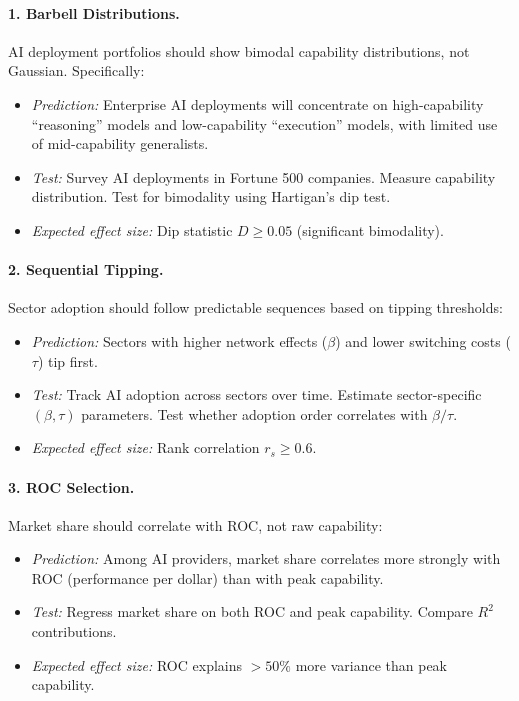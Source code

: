 \documentclass[12pt]{article}
\begin{document}
\paragraph{1. Barbell Distributions.} AI deployment portfolios should show bimodal capability distributions, not Gaussian. Specifically:
\begin{itemize}
    \item \textit{Prediction:} Enterprise AI deployments will concentrate on high-capability ``reasoning'' models and low-capability ``execution'' models, with limited use of mid-capability generalists.
    \item \textit{Test:} Survey AI deployments in Fortune 500 companies. Measure capability distribution. Test for bimodality using Hartigan's dip test.
    \item \textit{Expected effect size:} Dip statistic $D \geq 0.05$ (significant bimodality).
\end{itemize}

\paragraph{2. Sequential Tipping.} Sector adoption should follow predictable sequences based on tipping thresholds:
\begin{itemize}
    \item \textit{Prediction:} Sectors with higher network effects ($\beta$) and lower switching costs ($\tau$) tip first.
    \item \textit{Test:} Track AI adoption across sectors over time. Estimate sector-specific $(\beta, \tau)$ parameters. Test whether adoption order correlates with $\beta/\tau$.
    \item \textit{Expected effect size:} Rank correlation $r_s \geq 0.6$.
\end{itemize}

\paragraph{3. ROC Selection.} Market share should correlate with ROC, not raw capability:
\begin{itemize}
    \item \textit{Prediction:} Among AI providers, market share correlates more strongly with ROC (performance per dollar) than with peak capability.
    \item \textit{Test:} Regress market share on both ROC and peak capability. Compare $R^2$ contributions.
    \item \textit{Expected effect size:} ROC explains $>50\%$ more variance than peak capability.
\end{itemize}
\end{document}
